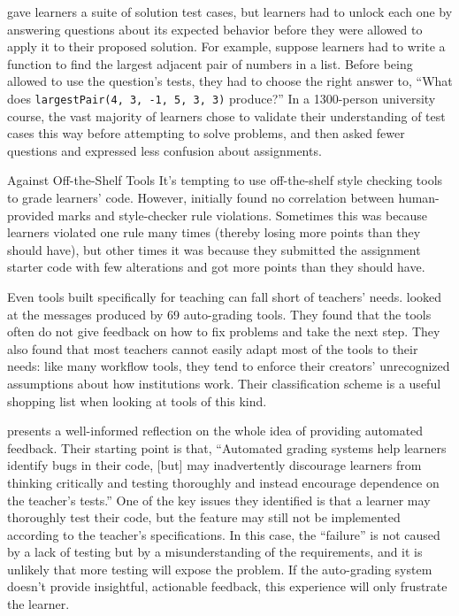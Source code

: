 \cite{Basu2015} gave learners a suite of solution test cases,
but learners had to unlock each one by answering questions about its expected behavior
before they were allowed to apply it to their proposed solution.
For example,
suppose learners had to write a function to find the largest adjacent pair of numbers in a list.
Before being allowed to use the question's tests,
they had to choose the right answer to,
``What does \texttt{largestPair(4, 3, -1, 5, 3, 3)} produce?''
In a 1300-person university course,
the vast majority of learners chose to validate their understanding of test cases this way
before attempting to solve problems,
and then asked fewer questions and expressed less confusion about assignments.

\begin{aside}{Against Off-the-Shelf Tools}
It's tempting to use off-the-shelf style checking tools to grade learners' code.
However,
\cite{Nutb2016} initially found no correlation between human-provided marks
and style-checker rule violations.
Sometimes this was because learners violated one rule many times
(thereby losing more points than they should have),
but other times it was because they submitted the assignment starter code with few alterations
and got more points than they should have.

Even tools built specifically for teaching can fall short of teachers' needs.
\cite{Keun2016a,Keun2016b} looked at the messages produced by 69 auto-grading tools.
They found that the tools often do not give feedback on how to fix problems and take the next step.
They also found that most teachers cannot easily adapt most of the tools to their needs:
like many workflow tools,
they tend to enforce their creators' unrecognized assumptions about how institutions work.
Their classification scheme is a useful shopping list
when looking at tools of this kind.
\end{aside}

\cite{Buff2015} presents a well-informed reflection on the whole idea of providing automated feedback.
Their starting point is that,
``Automated grading systems help learners identify bugs in their code,
[but] may inadvertently discourage learners from thinking critically and testing thoroughly
and instead encourage dependence on the teacher's tests.''
One of the key issues they identified is that
a learner may thoroughly test their code,
but the feature may still not be implemented according to the teacher's specifications.
In this case,
the ``failure'' is not caused by a lack of testing
but by a misunderstanding of the requirements,
and it is unlikely that more testing will expose the problem.
If the auto-grading system doesn't provide insightful, actionable feedback,
this experience will only frustrate the learner.


